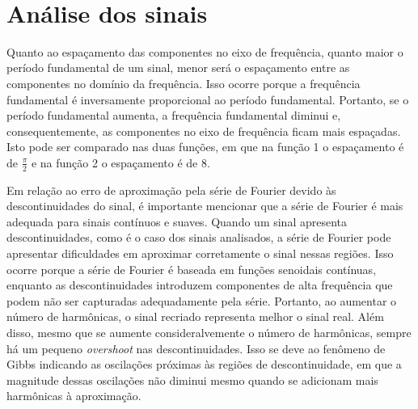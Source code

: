 \documentclass[11pt]{article}
\begin{document}
    \begin{center}
    \end{center}
    { \hspace*{\fill} \\}
    
    \hypertarget{anuxe1lise-dos-sinais}{%
\section{Análise dos sinais}\label{anuxe1lise-dos-sinais}}

Quanto ao espaçamento das componentes no eixo de frequência, quanto
maior o período fundamental de um sinal, menor será o espaçamento entre
as componentes no domínio da frequência. Isso ocorre porque a frequência
fundamental é inversamente proporcional ao período fundamental.
Portanto, se o período fundamental aumenta, a frequência fundamental
diminui e, consequentemente, as componentes no eixo de frequência ficam
mais espaçadas. Isto pode ser comparado nas duas funções, em que na
função 1 o espaçamento é de \(\frac{\pi}{2}\) e na função 2 o
espaçamento é de 8.

Em relação ao erro de aproximação pela série de Fourier devido às
descontinuidades do sinal, é importante mencionar que a série de Fourier
é mais adequada para sinais contínuos e suaves. Quando um sinal
apresenta descontinuidades, como é o caso dos sinais analisados, a série
de Fourier pode apresentar dificuldades em aproximar corretamente o
sinal nessas regiões. Isso ocorre porque a série de Fourier é baseada em
funções senoidais contínuas, enquanto as descontinuidades introduzem
componentes de alta frequência que podem não ser capturadas
adequadamente pela série. Portanto, ao aumentar o número de harmônicas,
o sinal recriado representa melhor o sinal real. Além disso, mesmo que
se aumente consideralvemente o número de harmônicas, sempre há um
pequeno \emph{overshoot} nas descontinuidades. Isso se deve ao fenômeno
de Gibbs indicando as oscilações próximas às regiões de descontinuidade,
em que a magnitude dessas oscilações não diminui mesmo quando se
adicionam mais harmônicas à aproximação.


    
    
    
\end{document}
